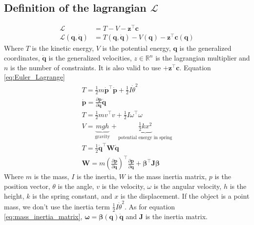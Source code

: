 \subsection{Definition of the lagrangian $\mathcal{L}$}
\begin{subequations}
\begin{align}
    \mathcal{L} &= T - V - \mathbf{z}^\top\mathbf{c}\\
    \mathcal{L}(\mathbf{q}, \dot{\mathbf{q}}) &= T(\mathbf{q}, \dot{\mathbf{q}}) - V(\mathbf{q}) - \mathbf{z}^\top \mathbf{c(q)}
    \label{eq:Euler_Lagrange}
\end{align}
\end{subequations}
Where $T$ is the kinetic energy, $V$ is the potential energy, $\mathbf{q}$ is the generalized coordinates, $\dot{\mathbf{q}}$ is the generalized velocities, $z \in \mathbb{R}^n $ is the lagrangian multiplier and $n$ is the number of constraints. It is also valid to use $+\mathbf{z}^\top\mathbf{c}$. Equation \eqref{eq:Euler_Lagrange} \newline
\begin{subequations}
\begin{align}
    T = \frac{1}{2}m\dot{\mathbf{p}}^\top\dot{\mathbf{p}} + \frac{1}{2}I\dot{\theta}^2 \\
    \mathbf{\dot{p}} = \frac{\partial \mathbf{p}}{\partial \mathbf{q}}\dot{\mathbf{q}} \\
    T = \frac{1}{2}mv^\top v + \frac{1}{2}I\omega^\top \omega \\
    V = \underbrace{mgh}_{\text{gravity}}  + \underbrace{\frac{1}{2}kx^2}_{\text{potential energy in spring}}  \\
    T = \frac{1}{2}\dot{\mathbf{q}}^\top\mathbf{W}\dot{\mathbf{q}} \\
    \mathbf{W} = m\left(\frac{\partial \mathbf{p}}{\partial \mathbf{q}}\right)^\top \frac{\partial \mathbf{p}}{\partial \mathbf{q}} + \mathbf{\beta}^\top \mathbf{J}\mathbf{\beta}
    \label{eq:mass_inertia_matrix}
\end{align}
\end{subequations}
Where $m$ is the mass, $I$ is the inertia, $W$ is the mass inertia matrix, $p$ is the position vector, $\theta$ is the angle, $v$ is the velocity, $\omega$ is the angular velocity, $h$ is the height, $k$ is the spring constant, and $x$ is the displacement. \newline 
If the object is a point mass, we don't use the inertia term $\frac{1}{2}I\dot{\theta}^2$. \newline
As for equation \eqref{eq:mass_inertia_matrix}, $\mathbf{\omega} = \mathbf{\beta(q)\dot{q}}$ and $\mathbf{J}$ is the inertia matrix. \newline
